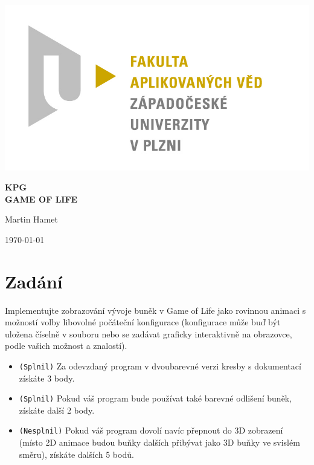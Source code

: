 \documentclass[12pt]{article}
\begin{document}
\begin{titlepage}
\includegraphics[scale=0.2, trim=5cm 0 0 30cm]{logo.jpg}
\begin{center}
\vspace{5cm}
{\Huge
\textbf{KPG}\\
\vspace{1cm}
}
{\Large
\textbf{GAME OF LIFE}
}
\end{center}
\vspace{\fill}

\begin{minipage}[t]{5cm}
\flushleft
Martin Hamet
\end{minipage}
\hfill
\begin{minipage}[t]{7cm}
\flushright
\today
\end{minipage}
\end{titlepage}

\tableofcontents
\newpage
\section{Zadání}
Implementujte zobrazování vývoje buněk v Game of Life jako rovinnou animaci s možností volby libovolné počáteční konfigurace (konfigurace může buď být uložena číselně v souboru nebo se zadávat graficky interaktivně na obrazovce, podle vašich možnost a znalostí).

\begin{itemize}
\item \texttt{(Splnil)} Za odevzdaný program v dvoubarevné verzi kresby s dokumentací získáte 3 body.
\item \texttt{(Splnil)} Pokud váš program bude používat také barevné odlišení buněk, získáte další 2 body.
\item \texttt{(Nesplnil)} Pokud váš program dovolí navíc přepnout do 3D zobrazení (místo 2D animace budou buňky dalších přibývat jako 3D buňky ve svislém směru), získáte dalších 5 bodů.
\end{itemize}
\end{document}

